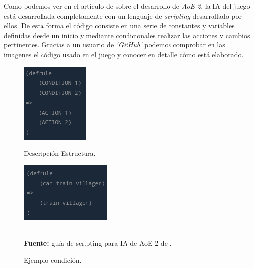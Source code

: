 Como podemos ver en el artículo de \citeauthor*{Pritchard2000} sobre el desarrollo de \textit{\ac{AoE} 2},
la \ac{IA} del juego está desarrollada completamente con un lenguaje de \textit{scripting} desarrollado
por ellos. De esta forma el código consiste en una serie de constantes y variables definidas desde un
inicio y mediante condicionales realizar las acciones  y cambios pertinentes. Gracias a un usuario
de \textit{`GitHub'} podemos comprobar en las imagenes el código usado en el juego y conocer
en detalle cómo está elaborado.

\begin{figure}[ht]
\centering
\begin{minipage}[c]{0.45\linewidth}
	\hspace{20mm}
	\includegraphics[height=0.15\textheight]{imagenes/marco_teo/referentes/aoe_scripting_1.png}
	\caption{Descripción Estructura.}
\end{minipage}
\begin{minipage}[c]{0.45\linewidth}
	\hspace{9mm}
	\includegraphics[height=0.15\textheight]{imagenes/marco_teo/referentes/aoe_scripting_2.png}
	\caption{Ejemplo condición.}
	\label{img:aoe_script_2}
\end{minipage}\\[3mm]
\textbf{Fuente:} guía de scripting para \ac{IA} de \ac{AoE} 2 de \citeauthor*{redmechanic2017}.
\end{figure}


